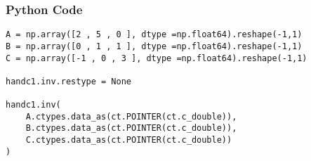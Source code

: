 \documentclass{beamer}
\begin{document}
\begin{frame}[fragile]
    \frametitle{Python Code}
    \begin{lstlisting}
A = np.array([2 , 5 , 0 ], dtype =np.float64).reshape(-1,1)
B = np.array([0 , 1 , 1 ], dtype =np.float64).reshape(-1,1)
C = np.array([-1 , 0 , 3 ], dtype =np.float64).reshape(-1,1)

handc1.inv.restype = None

handc1.inv(
    A.ctypes.data_as(ct.POINTER(ct.c_double)),
    B.ctypes.data_as(ct.POINTER(ct.c_double)),
    C.ctypes.data_as(ct.POINTER(ct.c_double))
)
\end{lstlisting}
\end{frame}
\end{document}
